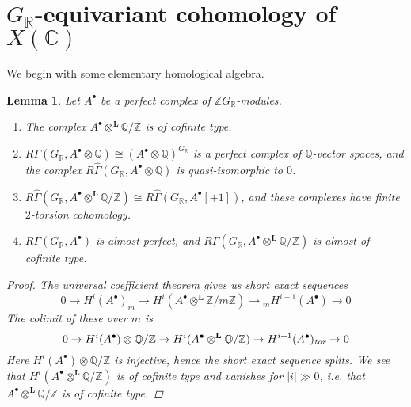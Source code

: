 \documentclass[leqno,12pt]{article}
\theoremstyle{plain}
\newtheorem{lemma}[theorem]{\indent\sc Lemma}
\theoremstyle{definition}
\newcommand{\CC}{\mathbb{C}}
\newcommand{\QQ}{\mathbb{Q}}
\newcommand{\RR}{\mathbb{R}}
\newcommand{\ZZ}{\mathbb{Z}}
\newcommand{\tor}{\text{\it tor}}
\begin{document}

\section{$G_\RR$-equivariant cohomology of $X (\CC)$}
\label{sec:GR-equivariant-cohomology}

We begin with some elementary homological algebra.

\begin{lemma}
  Let $A^\bullet$ be a perfect complex of $\ZZ G_\RR$-modules.

  \begin{enumerate}
  \item[1)] The complex $A^\bullet \otimes^\mathbf{L} \QQ/\ZZ$ is of cofinite
    type.

  \item[2)]
    $R\Gamma (G_\RR, A^\bullet \otimes \QQ) \cong (A^\bullet \otimes
    \QQ)^{G_\RR}$ is a perfect complex of $\QQ$-vector spaces, and the complex
    $R\widehat{\Gamma} (G_\RR, A^\bullet \otimes \QQ)$ is quasi-isomorphic to
    $0$.

  \item[3)]
    $R\widehat{\Gamma} (G_\RR, A^\bullet \otimes^\mathbf{L} \QQ/\ZZ) \cong
    R\widehat{\Gamma} (G_\RR, A^\bullet [+1])$, and these complexes have finite
    $2$-torsion cohomology.

  \item[4)] $R\Gamma (G_\RR, A^\bullet)$ is almost perfect, and
    $R\Gamma (G_\RR, A^\bullet \otimes^\mathbf{L} \QQ/\ZZ)$ is almost of
    cofinite type.
  \end{enumerate}

  \begin{proof}
    The universal coefficient theorem gives us short exact sequences
    $$0 \to H^i (A^\bullet)_m \to H^i (A^\bullet \otimes^\mathbf{L} \ZZ/m\ZZ) \to {}_m H^{i+1} (A^\bullet) \to 0$$
    The colimit of these over $m$ is
    $$0 \to H^i (A^\bullet) \otimes \QQ/\ZZ \to H^i (A^\bullet \otimes^\mathbf{L} \QQ/\ZZ) \to H^{i+1} (A^\bullet)_\tor \to 0$$
    Here $H^i (A^\bullet) \otimes \QQ/\ZZ$ is injective, hence the short exact
    sequence splits. We see that $H^i (A^\bullet \otimes^\mathbf{L} \QQ/\ZZ)$ is
    of cofinite type and vanishes for $|i| \gg 0$, i.e. that
    $A^\bullet \otimes^\mathbf{L} \QQ/\ZZ$ is of cofinite type.


\end{proof}
\end{lemma}
\end{document}
